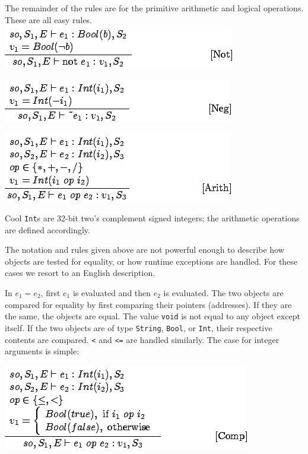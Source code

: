 \documentclass[]{article}
\begin{document}
The remainder of the rules are for the primitive arithmetic and logical
operations. These are all easy rules. \\

\includegraphics{img180.png}

\includegraphics{img182.png}

\includegraphics{img183.png}

Cool \texttt{Int}s are 32-bit two's complement signed integers; the
arithmetic operations are defined accordingly.

The notation and rules given above are not powerful enough to describe
how objects are tested for equality, or how runtime exceptions are
handled. For these cases we resort to an English description.

In $e_1 = e_2$, first $e_1$ is evaluated and then $e_2$ is evaluated.
The two objects are compared for equality by first comparing their
pointers (addresses). If they are the same, the objects are equal. The
value \texttt{void} is not equal to any object except itself. If the two
objects are of type \texttt{String}, \texttt{Bool}, or \texttt{Int},
their respective contents are compared. \texttt{\textless{}} and
\texttt{\textless{}=} are handled similarly. The case for integer
arguments is simple:

\includegraphics{img181.png}
\end{document}
